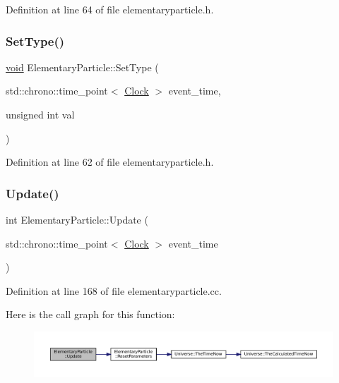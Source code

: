 Definition at line 64 of file elementaryparticle.\+h.

\mbox{\label{class_elementary_particle_a37d7718faf6be68d4374bcc56816f30a}} 
\subsubsection{\texorpdfstring{Set\+Type()}{SetType()}}
{\footnotesize\ttfamily \mbox{\hyperlink{glad_8h_a950fc91edb4504f62f1c577bf4727c29}{void}} Elementary\+Particle\+::\+Set\+Type (\begin{DoxyParamCaption}\item[{std\+::chrono\+::time\+\_\+point$<$ \mbox{\hyperlink{universe_8h_a0ef8d951d1ca5ab3cfaf7ab4c7a6fd80}{Clock}} $>$}]{event\+\_\+time,  }\item[{unsigned int}]{val }\end{DoxyParamCaption})\hspace{0.3cm}{\ttfamily [inline]}}



Definition at line 62 of file elementaryparticle.\+h.

\mbox{\label{class_elementary_particle_abf5114c3d032bc9511a14aa7368ec450}} 
\subsubsection{\texorpdfstring{Update()}{Update()}}
{\footnotesize\ttfamily int Elementary\+Particle\+::\+Update (\begin{DoxyParamCaption}\item[{std\+::chrono\+::time\+\_\+point$<$ \mbox{\hyperlink{universe_8h_a0ef8d951d1ca5ab3cfaf7ab4c7a6fd80}{Clock}} $>$}]{event\+\_\+time }\end{DoxyParamCaption})}



Definition at line 168 of file elementaryparticle.\+cc.

Here is the call graph for this function\+:\nopagebreak
\begin{figure}[H]
\begin{center}
\leavevmode
\includegraphics[width=350pt]{class_elementary_particle_abf5114c3d032bc9511a14aa7368ec450_cgraph}
\end{center}
\end{figure}


